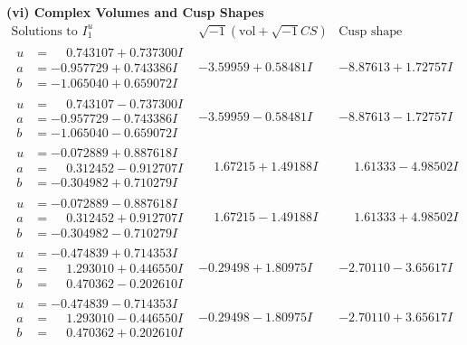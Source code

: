 \documentclass[1p]{elsarticle_modified}
\theoremstyle{definition}
\newcommand{\I}{\sqrt{-1}}
\begin{document}
\newpage\flushleft \textbf{(vi) Complex Volumes and Cusp Shapes}
$$\begin{array}{c|c|c}  
\text{Solutions to }I^u_{1}& \I (\text{vol} + \sqrt{-1}CS) & \text{Cusp shape}\\
 \hline 
\begin{aligned}
u &= \phantom{-}0.743107 + 0.737300 I \\
a &= -0.957729 + 0.743386 I \\
b &= -1.065040 + 0.659072 I\end{aligned}
 & -3.59959 + 0.58481 I & -8.87613 + 1.72757 I \\ \hline\begin{aligned}
u &= \phantom{-}0.743107 - 0.737300 I \\
a &= -0.957729 - 0.743386 I \\
b &= -1.065040 - 0.659072 I\end{aligned}
 & -3.59959 - 0.58481 I & -8.87613 - 1.72757 I \\ \hline\begin{aligned}
u &= -0.072889 + 0.887618 I \\
a &= \phantom{-}0.312452 - 0.912707 I \\
b &= -0.304982 + 0.710279 I\end{aligned}
 & \phantom{-}1.67215 + 1.49188 I & \phantom{-}1.61333 - 4.98502 I \\ \hline\begin{aligned}
u &= -0.072889 - 0.887618 I \\
a &= \phantom{-}0.312452 + 0.912707 I \\
b &= -0.304982 - 0.710279 I\end{aligned}
 & \phantom{-}1.67215 - 1.49188 I & \phantom{-}1.61333 + 4.98502 I \\ \hline\begin{aligned}
u &= -0.474839 + 0.714353 I \\
a &= \phantom{-}1.293010 + 0.446550 I \\
b &= \phantom{-}0.470362 - 0.202610 I\end{aligned}
 & -0.29498 + 1.80975 I & -2.70110 - 3.65617 I \\ \hline\begin{aligned}
u &= -0.474839 - 0.714353 I \\
a &= \phantom{-}1.293010 - 0.446550 I \\
b &= \phantom{-}0.470362 + 0.202610 I\end{aligned}
 & -0.29498 - 1.80975 I & -2.70110 + 3.65617 I \\ \hline\begin{aligned}

\end{aligned}
\end{array}$$
\end{document}
